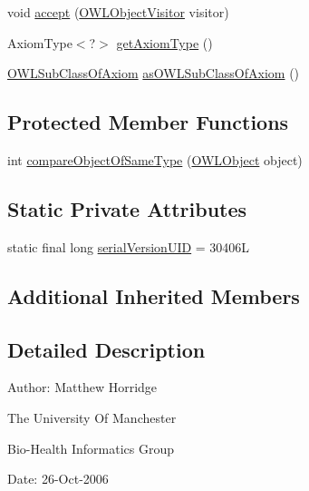\begin{DoxyCompactItemize}
void \hyperlink{classuk_1_1ac_1_1manchester_1_1cs_1_1owl_1_1owlapi_1_1_o_w_l_functional_data_property_axiom_impl_adecfe56028f9e2201122e7c42b193d76}{accept} (\hyperlink{interfaceorg_1_1semanticweb_1_1owlapi_1_1model_1_1_o_w_l_object_visitor}{O\-W\-L\-Object\-Visitor} visitor)
\item 
Axiom\-Type$<$?$>$ \hyperlink{classuk_1_1ac_1_1manchester_1_1cs_1_1owl_1_1owlapi_1_1_o_w_l_functional_data_property_axiom_impl_a9e964f025cc885557f5267a9f80d265d}{get\-Axiom\-Type} ()
\item 
\hyperlink{interfaceorg_1_1semanticweb_1_1owlapi_1_1model_1_1_o_w_l_sub_class_of_axiom}{O\-W\-L\-Sub\-Class\-Of\-Axiom} \hyperlink{classuk_1_1ac_1_1manchester_1_1cs_1_1owl_1_1owlapi_1_1_o_w_l_functional_data_property_axiom_impl_a344699251127479bfd6dac0859b3b138}{as\-O\-W\-L\-Sub\-Class\-Of\-Axiom} ()
\end{DoxyCompactItemize}
\subsection*{Protected Member Functions}
\begin{DoxyCompactItemize}
\item 
int \hyperlink{classuk_1_1ac_1_1manchester_1_1cs_1_1owl_1_1owlapi_1_1_o_w_l_functional_data_property_axiom_impl_a7234c0203cf4cb64b2877ca6143306a1}{compare\-Object\-Of\-Same\-Type} (\hyperlink{interfaceorg_1_1semanticweb_1_1owlapi_1_1model_1_1_o_w_l_object}{O\-W\-L\-Object} object)
\end{DoxyCompactItemize}
\subsection*{Static Private Attributes}
\begin{DoxyCompactItemize}
\item 
static final long \hyperlink{classuk_1_1ac_1_1manchester_1_1cs_1_1owl_1_1owlapi_1_1_o_w_l_functional_data_property_axiom_impl_afefd2d8486c91af0d996a7caa06fc097}{serial\-Version\-U\-I\-D} = 30406\-L
\end{DoxyCompactItemize}
\subsection*{Additional Inherited Members}


\subsection{Detailed Description}
Author\-: Matthew Horridge\par
 The University Of Manchester\par
 Bio-\/\-Health Informatics Group\par
 Date\-: 26-\/\-Oct-\/2006\par
\par
 

